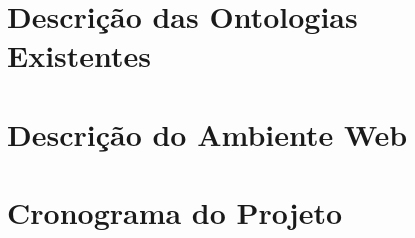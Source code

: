 \section{Descrição das Ontologias Existentes} %
\label{sec:introdu_o}
 

\section{Descrição do Ambiente Web} %
\label{sec:introdu_o}
 

\section{Cronograma do Projeto} %
\label{sec:produtos}
 
